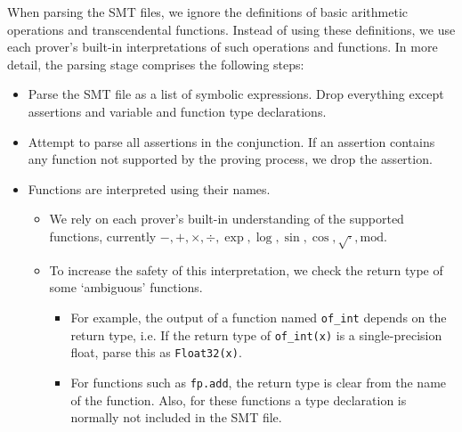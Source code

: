 \documentclass[runningheads]{llncs}
\begin{document}
When parsing the SMT files, we 
ignore the definitions of basic arithmetic operations and transcendental functions.
Instead of using these definitions, we use each prover's built-in interpretations of such operations and functions.
In more detail, the parsing stage comprises the following steps:

\begin{itemize}
  \item Parse the SMT file as a list of symbolic expressions. Drop everything except assertions and variable and function type declarations.
  \item Attempt to parse all assertions in the conjunction. If an assertion contains any function not supported by the proving process, we drop the assertion.
  \item Functions are interpreted using their names.
  \begin{itemize}
    \item We rely on each prover's built-in understanding of the supported functions, currently $-,+,\times,\div,\exp, \log, \sin, \cos, \sqrt{\cdot}, \mathrm{mod}$.
    \item To increase the safety of this interpretation, we check the return type of some `ambiguous' functions.
    \begin{itemize} 
      \item For example, the output of a function named \lstinline{of_int} depends on the return type, i.e. If the return type of \lstinline{of_int(x)} is a single-precision float, parse this as \lstinline{Float32(x)}.
      \item For functions such as \lstinline{fp.add}, the return type is clear from the name of the function. Also, for these functions a type declaration is normally not included in the SMT file.
    \end{itemize} 
  \end{itemize} %
\end{itemize}
\end{document}
